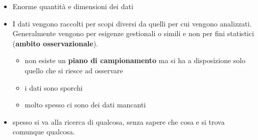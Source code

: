\begin{itemize}
  \item Enorme quantità e dimensioni dei dati
\item
  I dati vengono raccolti per scopi diversi da quelli per cui vengono
  analizzati. Generalmente vengono  per esigenze gestionali o
  simili e non per fini statistici (\textbf{ambito osservazionale}).

  \begin{itemize}
  \item
    non esiste un \textbf{piano di campionamento} ma si ha a
    disposizione solo quello che si riesce ad osservare
  \item
    i dati sono sporchi
  \item
    molto spesso ci sono dei dati mancanti
  \end{itemize}
\item
  spesso si va alla ricerca di qualcosa, senza sapere che cosa e si
  trova comunque qualcosa.
\end{itemize}
